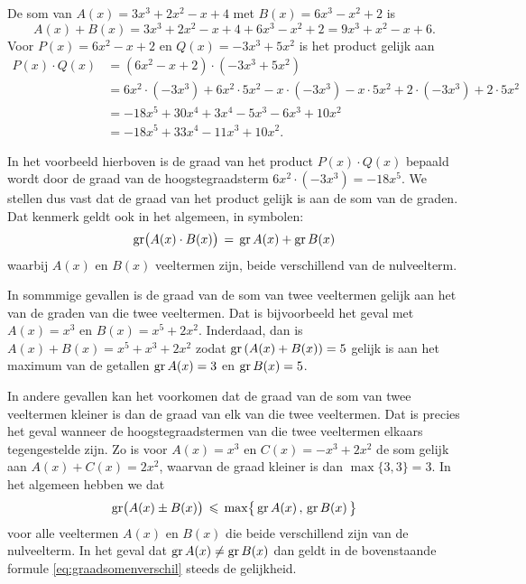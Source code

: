 \documentclass{ximera}
\begin{document}
\begin{example}
De som van $A(x) = 3x^3+2x^2-x+4$ met $B(x) = 6x^3-x^2+2$ is 
\[
A(x) + B(x) = 3x^3+2x^2-x+4 + 6x^3-x^2+2 = 9x^3 + x^2 - x + 6.
\]
Voor $P(x) = 6x^2-x+2$ en $Q(x) = -3x^3+5x^2$ is het product gelijk aan
\begin{align*}
P(x) \cdot Q(x) 
& = (6x^2-x+2) \cdot (-3x^3+5x^2) \\
& = 6x^2 \cdot (-3x^3) + 6x^2\cdot 5x^2 - x \cdot(-3x^3) - x \cdot 5x^2 + 2 \cdot(-3x^3) + 2 \cdot 5x^2 \\
& = -18x^5 + 30x^4 + 3x^4 - 5x^3 - 6x^3 + 10x^2 \\
& = -18x^5 + 33x^4 - 11x^3 + 10x^2.
\end{align*}
\end{example}




In het voorbeeld hierboven is de graad van het product $P(x) \cdot Q(x)$ bepaald wordt door de graad van de hoogstegraadsterm $6x^2 \cdot (-3x^3) = -18 x^{5}$. We stellen dus vast dat de graad van het product gelijk is aan de som van de graden. Dat kenmerk geldt ook in het algemeen, in symbolen: 
\begin{equation} \label{eq:graadproduct}
\operatorname{gr}\bigl( A(x) \cdot B(x) \bigr) \, = \, \operatorname{gr} A(x) + \operatorname{gr} B(x)
\end{equation}
waarbij $A(x)$ en $B(x)$ veeltermen zijn, beide verschillend van de nulveelterm. 

In sommmige gevallen is de graad van de som van twee veeltermen gelijk aan het  van de graden van die twee veeltermen. Dat is bijvoorbeeld het geval met 
$A(x) = x^3$ en $B(x) = x^5 + 2x^2$. Inderdaad, dan is $A(x) + B(x) = x^5 + x^3 + 2x^2$ zodat $\operatorname{gr}\left(A(x) + B(x)\right) = 5$ gelijk is aan het maximum van de getallen $\operatorname{gr} A(x) = 3$ en $\operatorname{gr} B(x) = 5$. %

In andere gevallen kan het voorkomen dat de graad van de som van twee veeltermen kleiner is dan de graad van elk van die twee veeltermen. Dat is precies het geval wanneer de hoogste\-graadstermen van die twee veeltermen elkaars tegengestelde zijn. Zo is voor $A(x) = x^3$ en $C(x) = -x^3 + 2x^2$ de som gelijk aan $A(x) + C(x) = 2x^2$, waarvan de graad kleiner is dan $\max\{3,3\} = 3$. In het algemeen hebben we dat  
\begin{equation} \label{eq:graadsomenverschil}
\operatorname{gr}\bigl( A(x) \pm B(x) \bigr) \, \leqslant \, \max \bigl\{ \,\operatorname{gr} A(x)\, , \, \operatorname{gr} B(x) \, \bigr\}
\end{equation}
voor alle veeltermen $A(x)$ en $B(x)$ die beide verschillend zijn van de nulveelterm. In het geval dat $\operatorname{gr} A(x) \neq \operatorname{gr} B(x)$ dan geldt in de bovenstaande formule \eqref{eq:graadsomenverschil} steeds de gelijkheid. 
\end{document}

